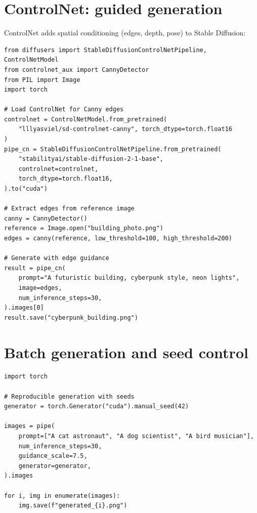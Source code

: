 \section{ControlNet: guided generation}

ControlNet adds spatial conditioning (edges, depth, pose) to Stable Diffusion:

\begin{verbatim}
from diffusers import StableDiffusionControlNetPipeline, ControlNetModel
from controlnet_aux import CannyDetector
from PIL import Image
import torch

# Load ControlNet for Canny edges
controlnet = ControlNetModel.from_pretrained(
    "lllyasviel/sd-controlnet-canny", torch_dtype=torch.float16
)
pipe_cn = StableDiffusionControlNetPipeline.from_pretrained(
    "stabilityai/stable-diffusion-2-1-base",
    controlnet=controlnet,
    torch_dtype=torch.float16,
).to("cuda")

# Extract edges from reference image
canny = CannyDetector()
reference = Image.open("building_photo.png")
edges = canny(reference, low_threshold=100, high_threshold=200)

# Generate with edge guidance
result = pipe_cn(
    prompt="A futuristic building, cyberpunk style, neon lights",
    image=edges,
    num_inference_steps=30,
).images[0]
result.save("cyberpunk_building.png")
\end{verbatim}

\section{Batch generation and seed control}

\begin{verbatim}
import torch

# Reproducible generation with seeds
generator = torch.Generator("cuda").manual_seed(42)

images = pipe(
    prompt=["A cat astronaut", "A dog scientist", "A bird musician"],
    num_inference_steps=30,
    guidance_scale=7.5,
    generator=generator,
).images

for i, img in enumerate(images):
    img.save(f"generated_{i}.png")
\end{verbatim}

